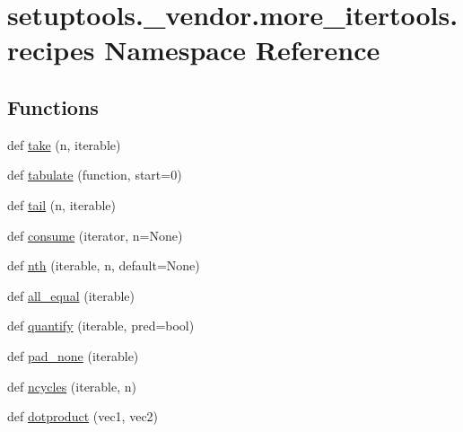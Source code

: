 \hypertarget{namespacesetuptools_1_1__vendor_1_1more__itertools_1_1recipes}{}\section{setuptools.\+\_\+vendor.\+more\+\_\+itertools.\+recipes Namespace Reference}
\label{namespacesetuptools_1_1__vendor_1_1more__itertools_1_1recipes}
\subsection*{Functions}
\begin{DoxyCompactItemize}
\item 
def \hyperlink{namespacesetuptools_1_1__vendor_1_1more__itertools_1_1recipes_a3501e9db076ba34775204bbe966d6e32}{take} (n, iterable)
\item 
def \hyperlink{namespacesetuptools_1_1__vendor_1_1more__itertools_1_1recipes_a5e469586263264b5ca8a6d1d71849cea}{tabulate} (function, start=0)
\item 
def \hyperlink{namespacesetuptools_1_1__vendor_1_1more__itertools_1_1recipes_acd82f149b51f4e643e24fc9478ca9363}{tail} (n, iterable)
\item 
def \hyperlink{namespacesetuptools_1_1__vendor_1_1more__itertools_1_1recipes_aa68c8235e080c9a560f35985f8e102cd}{consume} (iterator, n=None)
\item 
def \hyperlink{namespacesetuptools_1_1__vendor_1_1more__itertools_1_1recipes_a0c91334b79933102bd1c9ec06d966745}{nth} (iterable, n, default=None)
\item 
def \hyperlink{namespacesetuptools_1_1__vendor_1_1more__itertools_1_1recipes_a4a6dab112c110bf2e518b72e523632f2}{all\+\_\+equal} (iterable)
\item 
def \hyperlink{namespacesetuptools_1_1__vendor_1_1more__itertools_1_1recipes_a9e99a1496ad04f2d697e49f7d1cf209c}{quantify} (iterable, pred=bool)
\item 
def \hyperlink{namespacesetuptools_1_1__vendor_1_1more__itertools_1_1recipes_a1b44a1acded637f59c3422ea8b6c7fd9}{pad\+\_\+none} (iterable)
\item 
def \hyperlink{namespacesetuptools_1_1__vendor_1_1more__itertools_1_1recipes_a7de4140cecda3a2c9af5c746eb0b68d7}{ncycles} (iterable, n)
\item 
def \hyperlink{namespacesetuptools_1_1__vendor_1_1more__itertools_1_1recipes_a5b93842908e515ca08adb9f21005964d}{dotproduct} (vec1, vec2)

\end{DoxyCompactItemize}
